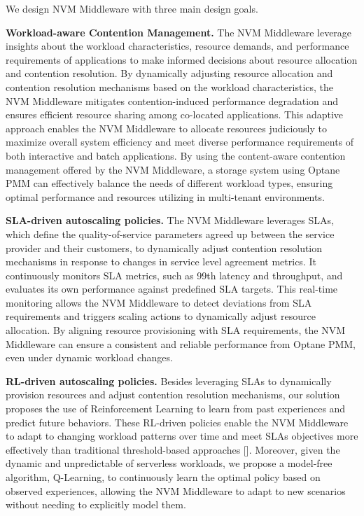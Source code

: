 We design NVM Middleware with three main design goals.

\textbf{Workload-aware Contention Management.} The NVM Middleware leverage insights about the workload characteristics, resource demands, and performance requirements of applications to make informed decisions about resource allocation and contention resolution. By dynamically adjusting resource allocation and contention resolution mechanisms based on the workload characteristics, the NVM Middleware mitigates contention-induced performance degradation and ensures efficient resource sharing among co-located applications. This adaptive approach enables the NVM Middleware to allocate resources judiciously to maximize overall system efficiency and meet diverse performance requirements of both interactive and batch applications. By using the content-aware contention management offered by the NVM Middleware, a storage system using Optane PMM can effectively balance the needs of different workload types, ensuring optimal performance and resources utilizing in multi-tenant environments.

\textbf{SLA-driven autoscaling policies.} The NVM Middleware leverages SLAs, which define the quality-of-service parameters agreed up between the service provider and their customers, to dynamically adjust contention resolution mechanisms in response to changes in service level agreement metrics. It continuously monitors SLA metrics, such as 99th latency and throughput, and evaluates its own performance against predefined SLA targets. This real-time monitoring allows the NVM Middleware to detect deviations from SLA requirements and triggers scaling actions to dynamically adjust resource allocation. By aligning resource provisioning with SLA requirements, the NVM Middleware can ensure a consistent and reliable performance from Optane PMM, even under dynamic workload changes.

\textbf{RL-driven autoscaling policies.} Besides leveraging SLAs to dynamically provision resources and adjust contention resolution mechanisms, our solution proposes the use of Reinforcement Learning to learn from past experiences and predict future behaviors.  These RL-driven policies enable the NVM Middleware to adapt to changing workload patterns over time and meet SLAs objectives more effectively than traditional threshold-based approaches []. Moreover, given the dynamic and unpredictable of serverless workloads, we propose a model-free algorithm, Q-Learning, to continuously learn the optimal policy based on observed experiences, allowing the NVM Middleware to adapt to new scenarios without needing to explicitly model them.

